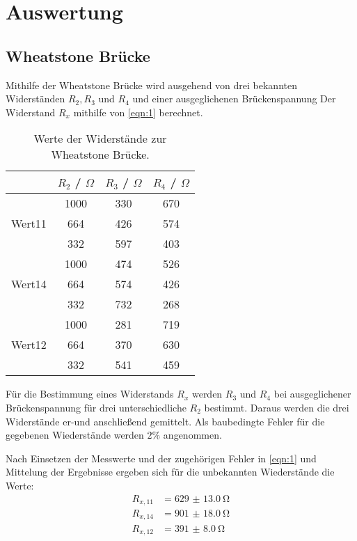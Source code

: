 \section{Auswertung}
\label{sec:Auswertung}

\subsection{Wheatstone Brücke}
Mithilfe der Wheatstone Brücke wird ausgehend von drei bekannten Widerständen
$R_2, R_3 $ und $R_4$ und einer ausgeglichenen Brückenspannung 
Der Widerstand $R_x$ mithilfe von \autoref{eqn:1} berechnet.
\begin{table}[H]
    \centering
    \caption{Werte der Widerstände zur Wheatstone Brücke.}
    \label{tab:t1}
    \begin{tabular}{|l|c|c|c|}
        \hline
        & \textbf{$R_2$ / $\Omega$} & \textbf{$R_3$ / $\Omega$} & \textbf{$R_4$ / $\Omega$} \\
        \hline
        \hline
               & 1000 & 330 & 670 \\
        Wert11 & 664  & 426 & 574 \\
               & 332  & 597 & 403 \\
        \hline
        \hline
               & 1000 & 474 & 526 \\
        Wert14 & 664  & 574 & 426 \\
               & 332  & 732 & 268 \\
        \hline
        \hline
               & 1000 & 281 & 719 \\
        Wert12 & 664  & 370 & 630 \\
               & 332  & 541 & 459 \\
        \hline
    \end{tabular}
\end{table}
\noindent Für die Bestimmung eines Widerstands $R_x$ werden $R_3$ und $R_4$
bei ausgeglichener Brückenspannung für drei unterschiedliche $R_2$ bestimmt.
Daraus werden die drei Widerstände er-und anschließend gemittelt.
Als baubedingte Fehler für die gegebenen Wiederstände werden $2\% $ angenommen.

Nach Einsetzen der Messwerte und der zugehörigen Fehler in \autoref{eqn:1}
und Mittelung der Ergebnisse ergeben sich für die unbekannten
Wiederstände die Werte:
\begin{align*}
       R_{x,11} &= \qty{629(13.0)}{\ohm}\\
       R_{x,14} &= \qty{901(18.0)}{\ohm}\\
       R_{x,12} &= \qty{391(8.0)}{\ohm}
\end{align*}


